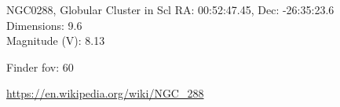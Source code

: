 \begin{block}{NGC0288, Globular Cluster in Scl}
    RA: 00:52:47.45, Dec: -26:35:23.6 \\ 
    Dimensions: 9.6 \\ 
    Magnitude (V): 8.13



    Finder fov: 60 

    \url{https://en.wikipedia.org/wiki/NGC_288} 
\end{block}
